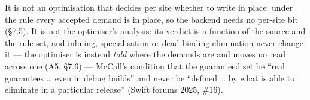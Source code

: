 
It is not an optimisation that decides per site whether to write in place: under the rule every accepted demand is in place, so the backend needs no per-site bit (§7.5). It is not the optimiser's analysis: its verdict is a function of the source and the rule set, and inlining, specialisation or dead-binding elimination never change it — the optimiser is instead \emph{told} where the demands are and moves no read across one (A5, §7.6) — McCall's condition that the guaranteed set be “real guarantees … even in debug builds” and never be “defined … by what  is able to eliminate in a particular release” (Swift forums 2025, \#16).
